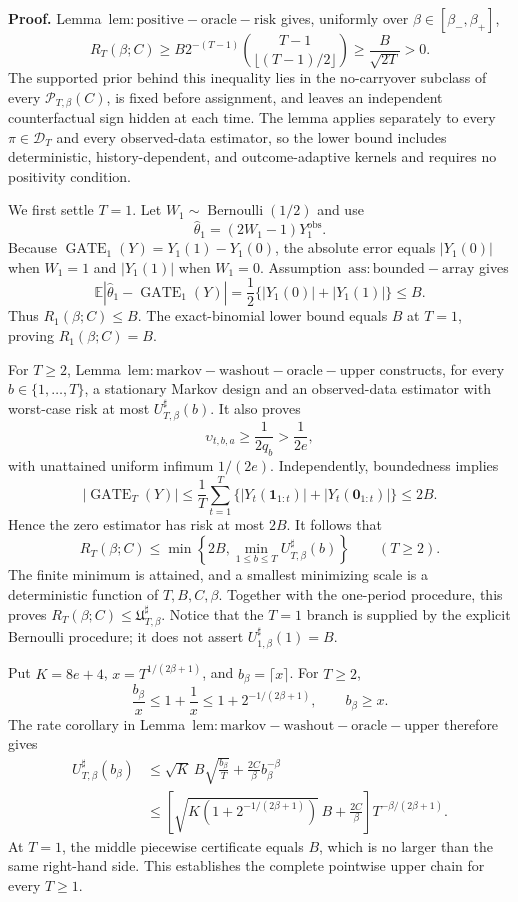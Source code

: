 \textbf{Proof.} Lemma~\(\mathrm{lem:positive-oracle-risk}\) gives, uniformly over \(\beta\in[\beta_-,\beta_+]\),
\[
R_T(\beta;C)
\ge B2^{-(T-1)}\binom{T-1}{\lfloor(T-1)/2\rfloor}
\ge\frac{B}{\sqrt{2T}}>0.
\]
The supported prior behind this inequality lies in the no-carryover subclass of every \(\mathcal P_{T,\beta}(C)\), is fixed before assignment, and leaves an independent counterfactual sign hidden at each time. The lemma applies separately to every \(\pi\in\mathcal D_T\) and every observed-data estimator, so the lower bound includes deterministic, history-dependent, and outcome-adaptive kernels and requires no positivity condition.

We first settle \(T=1\). Let \(W_1\sim\operatorname{Bernoulli}(1/2)\) and use
\[
\widehat\theta_1=(2W_1-1)Y_1^{\mathrm{obs}}.
\]
Because \(\operatorname{GATE}_1(Y)=Y_1(1)-Y_1(0)\), the absolute error equals \(|Y_1(0)|\) when \(W_1=1\) and \(|Y_1(1)|\) when \(W_1=0\). Assumption~\(\mathrm{ass:bounded-array}\) gives
\[
\mathbb E|\widehat\theta_1-\operatorname{GATE}_1(Y)|
=\frac12\{|Y_1(0)|+|Y_1(1)|\}\le B.
\]
Thus \(R_1(\beta;C)\le B\). The exact-binomial lower bound equals \(B\) at \(T=1\), proving \(R_1(\beta;C)=B\).

For \(T\ge2\), Lemma~\(\mathrm{lem:markov-washout-oracle-upper}\) constructs, for every \(b\in\{1,\ldots,T\}\), a stationary Markov design and an observed-data estimator with worst-case risk at most \(U_{T,\beta}^{\sharp}(b)\). It also proves
\[
\upsilon_{t,b,a}\ge\frac{1}{2q_b}>\frac{1}{2e},
\]
with unattained uniform infimum \(1/(2e)\). Independently, boundedness implies
\[
|\operatorname{GATE}_T(Y)|
\le\frac1T\sum_{t=1}^T\{|Y_t(\mathbf1_{1:t})|+|Y_t(\mathbf0_{1:t})|\}
\le2B.
\]
Hence the zero estimator has risk at most \(2B\). It follows that
\[
R_T(\beta;C)
\le\min\left\{2B,\min_{1\le b\le T}U_{T,\beta}^{\sharp}(b)\right\}
\qquad(T\ge2).
\]
The finite minimum is attained, and a smallest minimizing scale is a deterministic function of \(T,B,C,\beta\). Together with the one-period procedure, this proves \(R_T(\beta;C)\le\mathfrak U_{T,\beta}^{\sharp}\). Notice that the \(T=1\) branch is supplied by the explicit Bernoulli procedure; it does not assert \(U_{1,\beta}^{\sharp}(1)=B\).

Put \(K=8e+4\), \(x=T^{1/(2\beta+1)}\), and \(b_\beta=\lceil x\rceil\). For \(T\ge2\),
\[
\frac{b_\beta}{x}\le1+\frac1x\le1+2^{-1/(2\beta+1)},
\qquad b_\beta\ge x.
\]
The rate corollary in Lemma~\(\mathrm{lem:markov-washout-oracle-upper}\) therefore gives
\[
\begin{aligned}
U_{T,\beta}^{\sharp}(b_\beta)
&\le \sqrt K\,B\sqrt{\frac{b_\beta}{T}}+\frac{2C}{\beta}b_\beta^{-\beta}\\
&\le\left[\sqrt{K\left(1+2^{-1/(2\beta+1)}\right)}\,B+\frac{2C}{\beta}\right]T^{-\beta/(2\beta+1)}.
\end{aligned}
\]
At \(T=1\), the middle piecewise certificate equals \(B\), which is no larger than the same right-hand side. This establishes the complete pointwise upper chain for every \(T\ge1\).

